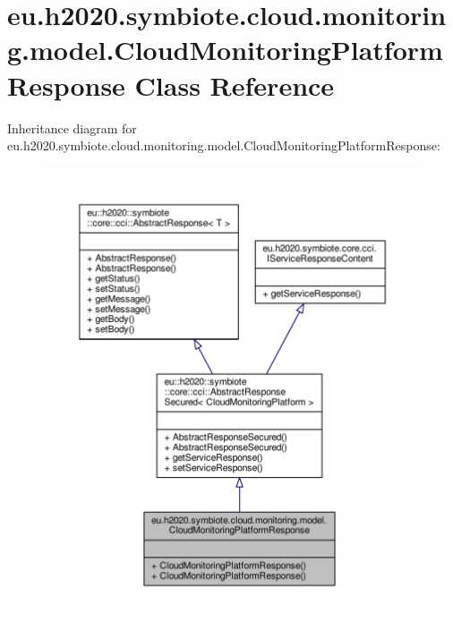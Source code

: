 \hypertarget{classeu_1_1h2020_1_1symbiote_1_1cloud_1_1monitoring_1_1model_1_1CloudMonitoringPlatformResponse}{}\section{eu.\+h2020.\+symbiote.\+cloud.\+monitoring.\+model.\+Cloud\+Monitoring\+Platform\+Response Class Reference}
\label{classeu_1_1h2020_1_1symbiote_1_1cloud_1_1monitoring_1_1model_1_1CloudMonitoringPlatformResponse}


Inheritance diagram for eu.\+h2020.\+symbiote.\+cloud.\+monitoring.\+model.\+Cloud\+Monitoring\+Platform\+Response\+:\nopagebreak
\begin{figure}[H]
\begin{center}
\leavevmode
\includegraphics[width=350pt]{classeu_1_1h2020_1_1symbiote_1_1cloud_1_1monitoring_1_1model_1_1CloudMonitoringPlatformResponse__inherit__graph}
\end{center}
\end{figure}


